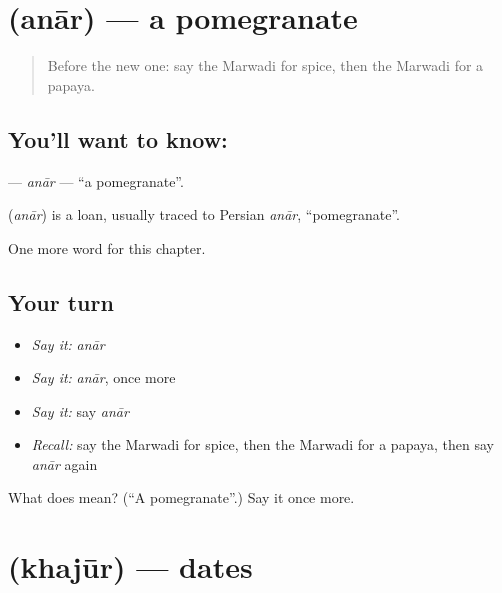 \section[\texorpdfstring{\mw{अनार} (anār)}{अनार (anār)}]{ (anār) — a pomegranate}

\label{lesson:MW-C137-anar}



\begin{quote}
Before the new one: say the Marwadi for spice, then the Marwadi for a papaya.
\end{quote}

\subsection*{You'll want to know: }
\textbf{} — \emph{anār} — \textquotedblleft{}a pomegranate\textquotedblright{}.

\begin{cousinweb}
\textbf{} (\emph{anār}) is a loan, usually traced to Persian \emph{anār}, \textquotedblleft{}pomegranate\textquotedblright{}.
\end{cousinweb}

\begin{grammarlens}[title={What you've built}]
One more word for this chapter.
\end{grammarlens}

\subsection*{Your turn}
\begin{itemize}
\raggedright
  \item \emph{Say it:} \emph{anār}
  \item \emph{Say it:} \emph{anār}, once more
  \item \emph{Say it:} say \emph{anār}
  \item \emph{Recall:} say the Marwadi for spice, then the Marwadi for a papaya, then say \emph{anār} again
\end{itemize}

\begin{tcolorbox}[breakable,colback=teal!4,colframe=teal!35!black,title={Before you move on}]
What does  mean? (\textquotedblleft{}A pomegranate\textquotedblright{}.) Say it once more.
\end{tcolorbox}
\section[\texorpdfstring{\mw{खजूर} (khajūr)}{खजूर (khajūr)}]{ (khajūr) — dates}

